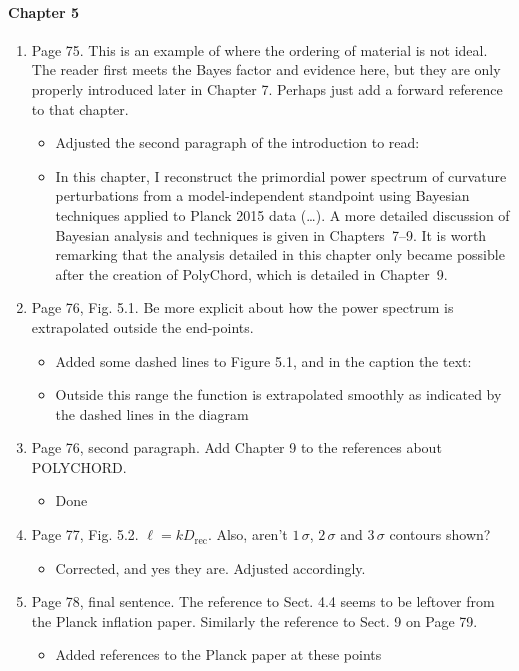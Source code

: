 \documentclass[11pt]{article}
\begin{document}
\paragraph{Chapter 5}
\begin{enumerate}
\item Page 75. This is an example of where the ordering of material is
  not ideal. The reader first meets the Bayes factor and evidence
  here, but they are only properly introduced later in Chapter
  7. Perhaps just add a forward reference to that chapter.
  \begin{itemize}
      \item Adjusted the second paragraph of the introduction to read:
      \item In this chapter, I reconstruct the primordial power spectrum of curvature perturbations from a model-independent standpoint using Bayesian techniques applied to Planck 2015 data (\ldots). A more detailed discussion of Bayesian analysis and techniques is given in Chapters~7--9. It is worth remarking that the analysis detailed in this chapter only became possible after the creation of PolyChord, which is detailed in Chapter~9. 

  \end{itemize}
\item Page 76, Fig. 5.1. Be more explicit about how the power spectrum
  is extrapolated outside the end-points.
  \begin{itemize}
      \item Added some dashed lines to Figure 5.1, and in the caption the text:
      \item Outside this range the function is extrapolated smoothly as indicated by the dashed lines in the diagram
  \end{itemize}
\item Page 76, second paragraph. Add Chapter 9 to the references about
  POLYCHORD.
  \begin{itemize}
      \item Done
  \end{itemize}
\item Page 77, Fig. 5.2. $\ell = k D_{\text{rec}}$. Also, aren't
  $1\,\sigma$, $2\,\sigma$ and $3\,\sigma$ contours shown?
  \begin{itemize}
      \item Corrected, and yes they are. Adjusted accordingly.
  \end{itemize}
\item Page 78, final sentence. The reference to Sect. 4.4 seems to be
  leftover from the Planck inflation paper. Similarly the reference to
  Sect. 9 on Page 79.
  \begin{itemize}
      \item Added references to the Planck paper at these points
  \end{itemize}
\end{enumerate}
\end{document}
